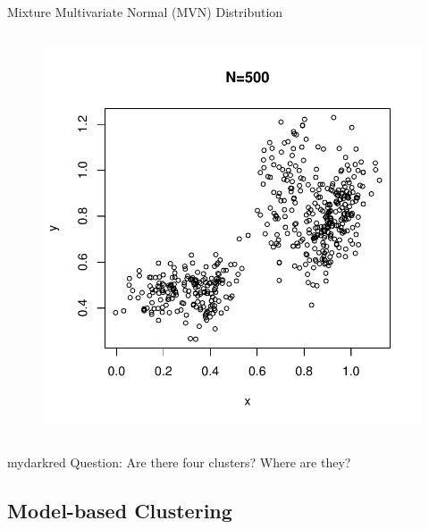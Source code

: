 \documentclass{beamer}
\begin{document}
\begin{frame}{Mixture Multivariate Normal (MVN) Distribution}
\begin{columns}
\begin{column}{0.55\textwidth}
  \begin{figure}
  \includegraphics[width=\textwidth]{./graph/toy-1}
  \end{figure}
\end{column}

\end{columns}

\vspace{-0.2cm}

\begin{center}
\begin{color}{mydarkred}
Question: Are there four clusters? Where are they?
\end{color}
\end{center}

\end{frame}


\subsection{Model-based Clustering}
\end{document}
